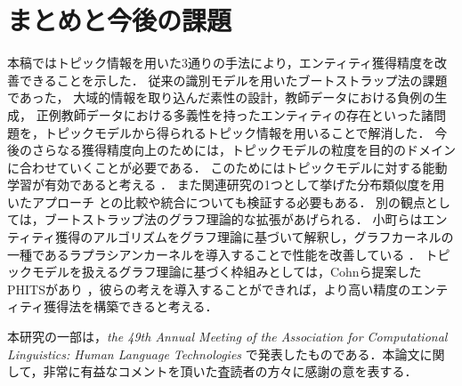 \documentclass[japanese]{jnlp_1.4}
\begin{document}
\section{まとめと今後の課題}

本稿ではトピック情報を用いた3通りの手法により，エンティティ獲得精度を改善できることを示した．
従来の識別モデルを用いたブートストラップ法の課題であった，
大域的情報を取り込んだ素性の設計，教師データにおける負例の生成，
正例教師データにおける多義性を持ったエンティティの存在といった諸問題を，トピックモデルから得られるトピック情報を用いることで解消した．
今後のさらなる獲得精度向上のためには，トピックモデルの粒度を目的のドメインに合わせていくことが必要である．
このためにはトピックモデルに対する能動学習が有効であると考える \cite{Hu2011}．
また関連研究の1つとして挙げた分布類似度を用いたアプローチ \cite{pantel2009web} との比較や統合についても検証する必要もある．
別の観点としては，ブートストラップ法のグラフ理論的な拡張があげられる．
小町らはエンティティ獲得のアルゴリズムをグラフ理論に基づいて解釈し，グラフカーネルの一種であるラプラシアンカーネルを導入することで性能を改善している \cite{小町10}．
トピックモデルを扱えるグラフ理論に基づく枠組みとしては，Cohnら提案したPHITSがあり \cite{cohn2000learning}，彼らの考えを導入することができれば，より高い精度のエンティティ獲得法を構築できると考える．





\acknowledgment

本研究の一部は，\textit{the 49th Annual Meeting of the Association for Computational Linguistics: Human Language Technologies} で発表したものである\cite{sadamitsu2011}．本論文に関して，非常に有益なコメントを頂いた査読者の方々に感謝の意を表する．
\end{document}
